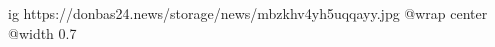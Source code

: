  
 
 
 
 

\ifcmt
  ig https://donbas24.news/storage/news/mbzkhv4yh5uqqayy.jpg
  @wrap center
  @width 0.7
\fi
